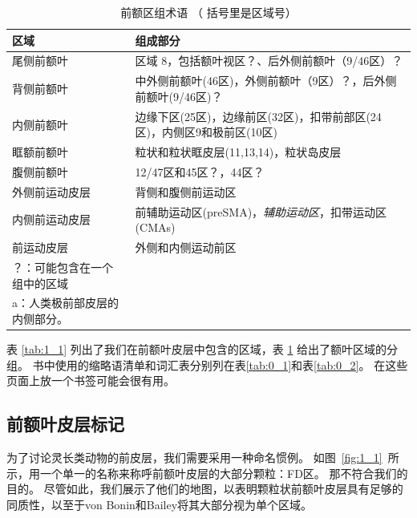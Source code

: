 \begin{table}[htbp] 
	\newcommand{\tabincell}[2]{\begin{tabular}{@{}#1@{}}#2\end{tabular}} %
	\centering
	\caption{前额区组术语 （ 括号里是区域号）\label{tab:1_2}}
	\renewcommand\arraystretch{1.5}	%
	\begin{tabular}{ll}
		\toprule
		区域 & 组成部分 \\
		\midrule
		尾侧前额叶 & 区域 8，包括额叶视区？、后外侧前额叶（9/46区）？  \\
		背侧前额叶 & 中外侧前额叶(46区)，外侧前额叶（9区）？，后外侧前额叶(9/46区)？ \\
		内侧前额叶&边缘下区(25区)，边缘前区(32区)，扣带前部区(24区)，内侧区9和极前区(10区)  \\
		眶额前额叶 & 粒状和粒状眶皮层(11,13,14)，粒状岛皮层  \\
		腹侧前额叶&12/47区和45区？，44区？ \\
		外侧前运动皮层 & 背侧和腹侧前运动区\\
		内侧前运动皮层 & 前辅助运动区(preSMA)，\textit{辅助运动区}，扣带运动区(CMAs)  \\
		前运动皮层 & 外侧和内侧运动前区  \\
		\bottomrule
	\par？：可能包含在一个组中的区域\\
		\par a：人类极前部皮层的内侧部分。
	\end{tabular}%
\end{table}%


\par
表 \ref{tab:1_1} 列出了我们在前额叶皮层中包含的区域，表 \ref{tab:1_2} 给出了额叶区域的分组。
书中使用的缩略语清单和词汇表分别列在表\ref{tab:0_1}和表\ref{tab:0_2}。
在这些页面上放一个书签可能会很有用。


\subsection{前额叶皮层标记}
为了讨论灵长类动物的前皮层，我们需要采用一种命名惯例。
如图~\ref{fig:1_1}~所示，用一个单一的名称来称呼前额叶皮层的大部分颗粒：FD区\cite{von1947neocortex}。
那不符合我们的目的。
尽管如此，我们展示了他们的地图，以表明颗粒状前额叶皮层具有足够的同质性，以至于von Bonin和Bailey将其大部分视为单个区域。

